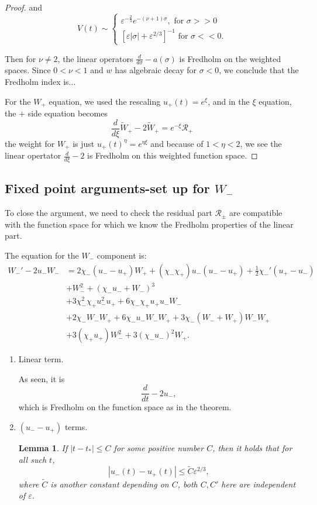\documentclass[letterpaper,11pt]{article}
\newcommand{\eps}{\varepsilon}
\numberwithin{equation}{section}
\theoremstyle{plain}
\newtheorem{lemma}[theorem]{Lemma}
\begin{document}
\begin{enumerate}
\begin{itemize}
\begin{proof}
and 
\[
V(t) \sim \begin{cases}
 \eps^{-\frac{2}{3}} e^{-(\nu+1)\sigma},  \text{ for }\sigma >>0 \\
[\eps |\sigma|+\eps^{2/3}]^{-1} \text{ for }\sigma << 0.
\end{cases}
\]

Then for $\nu \neq 2$, the linear operators $\frac{d}{d\sigma} -a(\sigma)$ is Fredholm on the weighted spaces.  Since $0 < \nu < 1$ and $w$ has algebraic decay for $\sigma<0$, we conclude that the Fredholm index is...

For the $W_+$ equation, we used the rescaling $u_+(t)  = e^\xi$, and in the $\xi$ equation, the $+$ side equation becomes
\[
\frac{d}{d\xi}\tilde{W}_+ -2\tilde{W}_+ = e^{-\xi}\mathcal{R}_+
\]
the weight for $W_+$ is just $u_+(t)^{\eta}=e^{\eta \xi}$ and because of $1<\eta<2$, we see the linear opertator $\frac{d}{d\xi}-2$ is Fredholm on this weighted function space.
\end{proof}

\pagebreak

\subsection{Fixed point arguments-set up for $W_-$}
To close the argument, we need to check the residual part $\mathcal{R}_{\pm}$ are compatible with the function space for which we know the Fredholm properties of the linear part.

The equation for the $W_-$ component is:
\begin{align*}
W_-'  - 2u_-W_-&= 2\chi_-(u_- -u_+)W_+ + (\chi_-\chi_+) u_-(u_- -u_+)+\frac{1}{2}\chi_-'(u_+ -u_-) \\
&+W_-^2+ (\chi_-u_- + W_-)^3\\
&+ 3\chi_-^2\chi_+ u_-^2 u_+ + 6\chi_-\chi_+ u_+ u_-W_-\\
 &+2\chi_-W_-W_+  + 6\chi_- u_- W_- W_+ + 3\chi_-(W_-+W_+)W_-W_+ \\&+3(\chi_+u_+)W_-^2 + 3(\chi_-u_-)^2W_+.
\end{align*}

\begin{enumerate}
\item Linear term.

As seen, it is 
\[
\frac{d}{dt} - 2u_-,
\]
which is Fredholm on the function space as in the theorem.


\item $(u_--u_+)$ terms.
\begin{lemma} \label{DifrEsti}
If $|t-t_*|\le C$ for some positive number $C$, then it holds that for all such $t$,
\[
|u_-(t)-u_+(t)| \le \tilde{C}\eps^{2/3},
\] 
where $\tilde{C}$ is another constant depending on $C$, both $C,C'$ here are independent of $\eps$.
\end{lemma}


\end{enumerate}
\end{itemize}
\end{enumerate}
\end{document}
